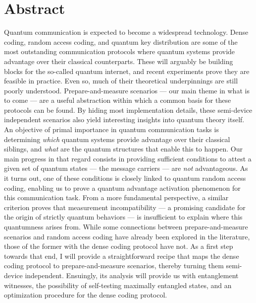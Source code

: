 \begingroup
\let\clearpage\relax

\chapter*{Abstract}
\thispagestyle{empty}

Quantum communication is expected to become a widespread technology. Dense coding, random access coding, and quantum key distribution are some of the most outstanding communication protocols where quantum systems provide advantage over their classical counterparts. These will arguably be building blocks for the so-called quantum internet, and recent experiments prove they are feasible in practice. Even so, much of their theoretical underpinnings are still poorly understood. Prepare-and-measure scenarios --- our main theme in what is to come --- are a useful abstraction within which a common basis for these protocols can be found. By hiding most implementation details, these semi-device independent scenarios also yield interesting insights into quantum theory itself. An objective of primal importance in quantum communication tasks is determining \emph{which} quantum systems provide advantage over their classical siblings, and \emph{what} are the quantum structures that enable this to happen. Our main progress in that regard consists in providing sufficient conditions to attest a given set of quantum states --- the message carriers --- are \emph{not} advantageous. As it turns out, one of these conditions is closely linked to quantum random access coding, enabling us to prove a quantum advantage activation phenomenon for this communication task. From a more fundamental perspective, a similar criterion proves that measurement incompatibility --- a promising candidate for the origin of strictly quantum behaviors --- is insufficient to explain where this quantumness arises from. While some connections between prepare-and-measure scenarios and random access coding have already been explored in the literature, those of the former with the dense coding protocol have not. As a first step towards that end, I will provide a straightforward recipe that maps the dense coding protocol to prepare-and-measure scenarios, thereby turning them semi-device independent. Ensuingly, its analysis will provide us with entanglement witnesses, the possibility of self-testing maximally entangled states, and an optimization procedure for the dense coding protocol.




\endgroup